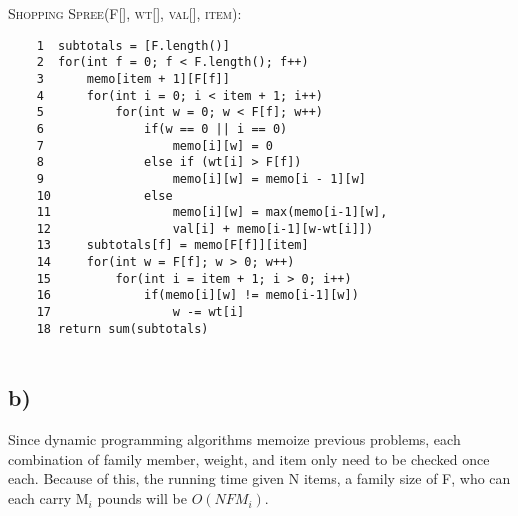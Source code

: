 \documentclass{article}
\begin{document}
\textsc{Shopping Spree(F[], wt[], val[], item):}
    
\begin{verbatim}
    1  subtotals = [F.length()]
    2  for(int f = 0; f < F.length(); f++)
    3      memo[item + 1][F[f]]
    4      for(int i = 0; i < item + 1; i++)
    5          for(int w = 0; w < F[f]; w++)
    6              if(w == 0 || i == 0)
    7                  memo[i][w] = 0
    8              else if (wt[i] > F[f])
    9                  memo[i][w] = memo[i - 1][w]
    10             else
    11                 memo[i][w] = max(memo[i-1][w],
    12                 val[i] + memo[i-1][w-wt[i]])
    13     subtotals[f] = memo[F[f]][item]
    14     for(int w = F[f]; w > 0; w++)
    15         for(int i = item + 1; i > 0; i++)
    16             if(memo[i][w] != memo[i-1][w])
    17                 w -= wt[i]
    18 return sum(subtotals)
                    
\end{verbatim}

\subsection*{b)}

Since dynamic programming algorithms memoize previous problems, each combination of family member, weight, and item only need to be checked once each.  Because of this, the running time given N items, a family size of F, who can each carry M$_i$ pounds will be $O(NFM_i)$.
\end{document}
